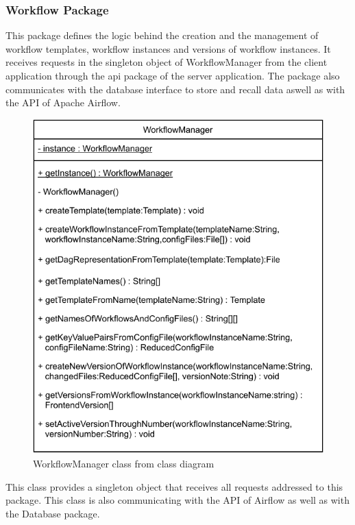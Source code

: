 \subsubsection{Workflow Package}
This package defines the logic behind the creation and the management of workflow templates, workflow instances and versions of workflow instances. It receives requests in the singleton object of WorkflowManager from the client application through the api package of the server application. The package also communicates with the database interface to store and recall data aswell as with the API of Apache Airflow.


\begin{figure}[h]
\centerline{\includegraphics[scale=1]{res/Klassen/WorkflowManager.pdf}}
\caption{WorkflowManager class from class diagram}
\end{figure}

This class provides a singleton object that receives all requests addressed to this package. This class is also communicating with the API of Airflow as well as with the Database package.

